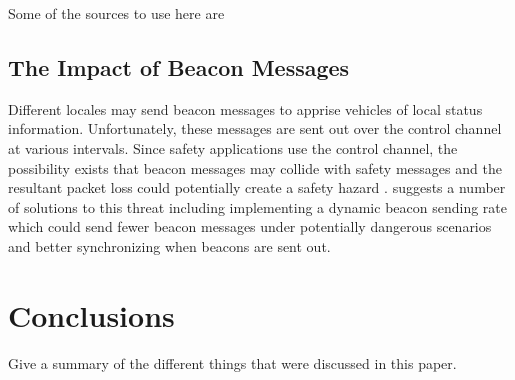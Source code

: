 \documentclass[twoside,conference]{IEEEtran}
\begin{document}
		Some of the sources to use here are \cite{Lansford2013,Chang2013,Toyota2013,NTIA2013}
		
	\subsection{The Impact of Beacon Messages}\label{sec:beacons}
		Different locales may send beacon messages to apprise vehicles of local status information. Unfortunately, these messages are sent out over the control channel at various intervals. Since safety applications use the control channel, the possibility exists that beacon messages may collide with safety messages and the resultant packet loss could potentially create a safety hazard \cite{Doukha2015}. \cite{Doukha2015} suggests a number of solutions to this threat including implementing a dynamic beacon sending rate which could send fewer beacon messages under potentially dangerous scenarios and better synchronizing when beacons are sent out.

\section{Conclusions}\label{sec:conclusions}
	Give a summary of the different things that were discussed in this paper.

\cleardoublepage


\end{document}

